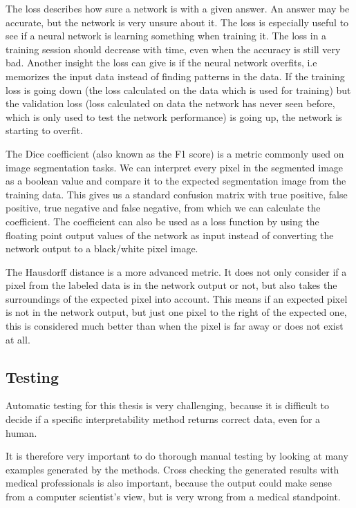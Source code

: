 The loss describes how sure a network is with a given answer. An answer may be accurate, but the network is very unsure about it. The loss is especially useful to see if a neural network is learning something when training it. The loss in a training session should decrease with time, even when the accuracy is still very bad.
Another insight the loss can give is if the neural network overfits, i.e memorizes the input data instead of finding patterns in the data. If the training loss is going down (the loss calculated on the data which is used for training) but the validation loss (loss calculated on data the network has never seen before, which is only used to test the network performance) is going up, the network is starting to overfit.

The Dice coefficient (also known as the F1 score) is a metric commonly used on image segmentation tasks. We can interpret every pixel in the segmented image as a boolean value and compare it to the expected segmentation image from the training data. This gives us a standard confusion matrix with true positive, false positive, true negative and false negative, from which we can calculate the coefficient. The coefficient can also be used as a loss function by using the floating point output values of the network as input instead of converting the network output to a black/white pixel image.

The Hausdorff distance is a more advanced metric. It does not only consider if a pixel from the labeled data is in the network output or not, but also takes the surroundings of the expected pixel into account. This means if an expected pixel is not in the network output, but just one pixel to the right of the expected one, this is considered much better than when the pixel is far away or does not exist at all.

\subsection{Testing}
Automatic testing for this thesis is very challenging, because it is difficult to decide if a specific interpretability method returns correct data, even for a human.

It is therefore very important to do thorough manual testing by looking at many examples generated by the methods. Cross checking the generated results with medical professionals is also important, because the output could make sense from a computer scientist's view, but is very wrong from a medical standpoint.

